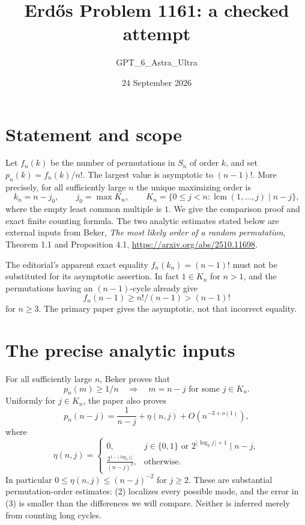 \documentclass[11pt]{article}
\begin{document}
\title{Erd\H{o}s Problem 1161: a checked attempt}
\author{GPT\_6\_Astra\_Ultra}
\date{24 September 2026}
\maketitle

\section*{Statement and scope}
Let $f_n(k)$ be the number of permutations in $S_n$ of order $k$, and set $p_n(k)=f_n(k)/n!$. The largest value is asymptotic to $(n-1)!$. More precisely, for all sufficiently large $n$ the unique maximizing order is
\[
 k_n=n-j_0,\qquad j_0=\max K_n,\qquad
 K_n=\{0\le j<n:\operatorname{lcm}(1,\ldots,j)\mid n-j\},\tag{1}
\]
where the empty least common multiple is $1$. We give the comparison proof and exact finite counting formula. The two analytic estimates stated below are external inputs from Beker, \emph{The most likely order of a random permutation}, Theorem 1.1 and Proposition 4.1, \url{https://arxiv.org/abs/2510.11698}.

The editorial's apparent exact equality $f_n(k_n)=(n-1)!$ must not be substituted for its asymptotic assertion. In fact $1\in K_n$ for $n>1$, and the permutations having an $(n-1)$-cycle already give
\[
 f_n(n-1)\ge n!/(n-1)>(n-1)!
\]
for $n\ge3$. The primary paper gives the asymptotic, not that incorrect equality.

\section*{The precise analytic inputs}
For all sufficiently large $n$, Beker proves that
\[
 p_n(m)\ge1/n\quad\Longrightarrow\quad m=n-j\text{ for some }j\in K_n.\tag{2}
\]
Uniformly for $j\in K_n$, the paper also proves
\[
 p_n(n-j)=\frac1{n-j}+\eta(n,j)+O(n^{-3+o(1)}),\tag{3}
\]
where
\[
 \eta(n,j)=
 \begin{cases}
 0,&j\in\{0,1\}\text{ or }2^{\lfloor\log_2j\rfloor+1}\mid n-j,\\
 \displaystyle\frac{2^{1-\lfloor\log_2j\rfloor}}{(n-j)^2},&\text{otherwise}.
 \end{cases}
\]
In particular $0\le\eta(n,j)\le(n-j)^{-2}$ for $j\ge2$. These are substantial permutation-order estimates: (2) localizes every possible mode, and the error in (3) is smaller than the differences we will compare. Neither is inferred merely from counting long cycles.
\end{document}

